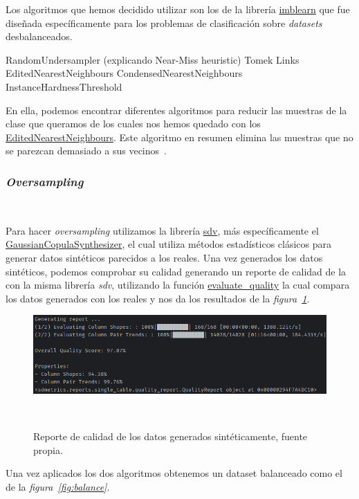 Los algoritmos que hemos decidido utilizar son los de la librería \href{https://imbalanced-learn.org/stable/}{imblearn} que fue diseñada específicamente para los problemas de clasificación sobre \textit{datasets} desbalanceados.

RandomUndersampler (explicando Near-Miss heuristic)
Tomek Links
EditedNearestNeighbours
CondensedNearestNeighbours
InstanceHardnessThreshold

En ella, podemos encontrar diferentes algoritmos para reducir las muestras de la clase que queramos de los cuales nos hemos quedado con los 
\href{https://imbalanced-learn.org/stable/references/generated/imblearn.under_sampling.EditedNearestNeighbours.html}{EditedNearestNeighbours}. Este algoritmo en resumen elimina las muestras que no se parezcan 
demasiado a sus vecinos\ \cite{Wil72}.

\subsubsection{\textit{Oversampling}}\ \label{sec:oversampling}

Para hacer \textit{oversampling} utilizamos la librería \href{https://sdv.dev/}{sdv}, más específicamente el 
\href{https://docs.sdv.dev/sdv/single-table-data/modeling/synthesizers/gaussiancopulasynthesizer}{GaussianCopulaSynthesizer}, el cual utiliza métodos estadísticos clásicos para generar datos sintéticos parecidos 
a los reales. Una vez generados los datos sintéticos, podemos comprobar su calidad generando un reporte de calidad de la con la misma librería \textit{sdv}, utilizando la función 
\href{https://docs.sdv.dev/sdv/single-table-data/evaluation#evaluate_quality}{evaluate\_quality} la cual compara los datos generados con los reales y nos da los resultados de la
\textit{figura\ \ref{fig:quality_report}}.

\begin{figure}[!ht]
    \centering
    \includegraphics[width=0.8\linewidth]{media/images/quality_report.png}
    \caption{Reporte de calidad de los datos generados sintéticamente, fuente propia.}\ \label{fig:quality_report}
\end{figure}

Una vez aplicados los dos algoritmos obtenemos un \gls{dataset} balanceado como el de la \textit{figura\ \ref{fig:balance}}.

